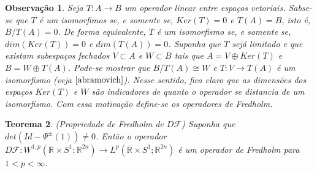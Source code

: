 \documentclass[12pt]{book}
\newtheorem{teorema}{Teorema}[section]
\newtheorem{observacao}[teorema]{Observação}
\newcommand{\circulo}{S^{1}}
\newcommand{\diferencialfloer}{D\operadorFloer}
\newcommand{\espacoLpcontradominio}[2]{L^{p}(#1;#2)}
\newcommand{\espacoLpretacirculo}{\espacoLpcontradominio{\retacartesianocirculo}{\real{2n}}}
\newcommand{\espacosobolevcontradominio}[2]{W^{1,p}(#1;#2)}
\newcommand{\espacosobolevretacirculo}{\espacosobolevcontradominio{\retacartesianocirculo}{\real{2n}}}
\newcommand{\operadorFloer}{\mathcal{F}}
\newcommand{\retacartesianocirculo}{\real{} \times \circulo}
\newcommand{\real}[1]{\mathbb{R}^{#1}}
\begin{document}
	\begin{observacao}
		Seja $T:A\to B$ um operador linear entre espaços vetoriais. Sabse-se que $T$ é um isomorfimos se, e somente se, $Ker(T) = 0$ e $T(A) = B$, isto é, $B/T(A) = 0$. De forma equivalente, $T$ é um isomorfismo se, e somente se, $dim(Ker(T)) = 0$ e $dim(T(A)) = 0$. Suponha que $T$ sejá limitado e que existam subespaços fechados $V \subset A$ e $W \subset B$ tais que $A=V\oplus Ker(T)$ e $B=W\oplus T(A)$. Pode-se mostrar que $B/T(A) \cong W$ e $T:V \to T(A)$ é um isomorfismo (veja $\cite{abramovich}$). Nesse sentido, fica claro que as dimensões dos espaços $Ker(T)$ e $W$ são indicadores de quanto o operador se distancia de um isomorfismo. Com essa motivação define-se os operadores de Fredholm.
	\end{observacao}
	
	\begin{teorema}
		(Propriedade de Fredholm de $\diferencialfloer$) Suponha que $det(Id - \Psi^{\pm}(1)) \neq 0$. Então o operador $\diferencialfloer: \espacosobolevretacirculo\to \espacoLpretacirculo$ é um operador de Fredholm para $1<p<\infty$.
	\end{teorema}
\end{document}
